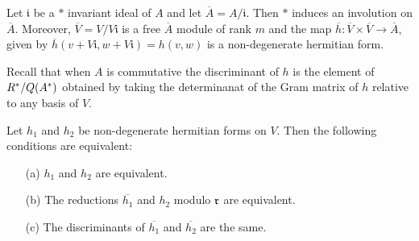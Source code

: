 Let $\mathfrak{i}$ be a $*$ invariant ideal of $A$ and let $\overline{A} = A / \mathfrak{i}$.
Then $*$ induces an involution on $\overline{A}$.
Moreover, $\overline{V} = V / V \mathfrak{i}$ is a free $\overline{A}$ module of rank $m$ and the map $\overline{h}: \overline{V} \times \overline{V} \to \overline{A}$,
given by $\overline{h}(v + V \mathfrak{i}, w + V \mathfrak{i}) = h(v, w)$ is a non-degenerate hermitian form.

Recall that when $A$ is commutative the discriminant of $h$ is the element of $R^* / Q(A^*)$ obtained by taking the determinanat of the Gram matrix of $h$ relative to any basis of $V$.

\begin{corollary}\label{cor3.6}
Let $h_1$ and $h_2$ be non-degenerate hermitian forms on $V$.
Then the following conditions are equivalent:
\begin{itemize}
\item[(a)] $h_1$ and $h_2$ are equivalent.
\item[(b)] The reductions $\overline{h_1}$ and $h_2$ modulo $\mathfrak{r}$ are equivalent.
\item[(c)] The discriminants of $\overline{h_1}$ and $\overline{h_2}$ are the same.
\end{itemize}
\end{corollary}
